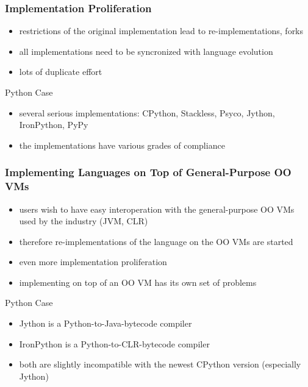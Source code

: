 \documentclass[utf8x]{beamer}
\begin{document}
\begin{frame}
  \frametitle{Implementation Proliferation}
  \begin{itemize}
  \item
    restrictions of the original implementation lead to re-implementations,
    forks
  \item
    all implementations need to be syncronized with language evolution
  \item
    lots of duplicate effort
  \end{itemize}
  \pause
  \begin{block}{
    Python Case}
    \begin{itemize}
    \item
      several serious implementations: CPython, Stackless, Psyco, Jython,
      IronPython, PyPy
    \item
      the implementations have various grades of compliance
    \end{itemize}
  \end{block}
\end{frame}

\begin{frame}
  \frametitle{Implementing Languages on Top of General-Purpose OO VMs}
  \begin{itemize}
  \item
    users wish to have easy interoperation with the general-purpose OO VMs used
    by the industry (JVM, CLR)
  \item
    therefore re-implementations of the language on the OO VMs are started
  \item
    even more implementation proliferation
  \item
    implementing on top of an OO VM has its own set of problems
  \end{itemize}
  \pause
  \begin{block}{
    Python Case}
    \begin{itemize}
    \item
      \alert{Jython} is a Python-to-Java-bytecode compiler
    \item
      \alert{IronPython} is a Python-to-CLR-bytecode compiler
    \item
      both are slightly incompatible with the newest CPython version (especially
      Jython)
    \end{itemize}
  \end{block}
\end{frame}
\end{document}
